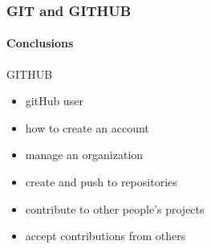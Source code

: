 \begin{frame}
	\frametitle{GIT and GITHUB}
	\framesubtitle{Conclusions}
	\addtocounter{nframe}{1}

	\begin{block}{GITHUB}
		\begin{itemize}
			\item gitHub user
			\item how to create an account
			\item manage an organization
			\item create and push to repositories
			\item contribute to other people’s projects
			\item accept contributions from others
		\end{itemize}
	\end{block}
\end{frame}










